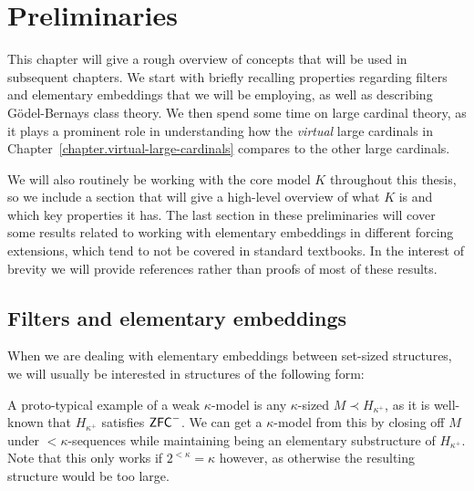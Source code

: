 \documentclass[../../main]{subfiles}
\begin{document}
\chapter{Preliminaries}
\thispagestyle{fancy}

This chapter will give a rough overview of concepts that will be used in subsequent chapters. We start with briefly recalling properties regarding filters and elementary embeddings that we will be employing, as well as describing \gbc\, G\"odel-Bernays class theory. We then spend some time on large cardinal theory, as it plays a prominent role in understanding how the \textit{virtual} large cardinals in Chapter~\ref{chapter.virtual-large-cardinals} compares to the other large cardinals.

We will also routinely be working with the core model $K$ throughout this thesis, so we include a section that will give a high-level overview of what $K$ is and which key properties it has. The last section in these preliminaries will cover some results related to working with elementary embeddings in different forcing extensions, which tend to not be covered in standard textbooks. In the interest of brevity we will provide references rather than proofs of most of these results.


\section{Filters and elementary embeddings}
\label{prelims.filters}

When we are dealing with elementary embeddings between set-sized structures, we will usually be interested in structures of the following form:


A proto-typical example of a weak $\kappa$-model is any $\kappa$-sized $M\prec H_{\kappa^+}$, as it is well-known that $H_{\kappa^+}$ satisfies $\textsf{ZFC}^-$. We can get a $\kappa$-model from this by closing off $M$ under ${<}\kappa$-sequences while maintaining being an elementary substructure of $H_{\kappa^+}$. Note that this only works if $2^{<\kappa}=\kappa$ however, as otherwise the resulting structure would be too large.
\end{document}
